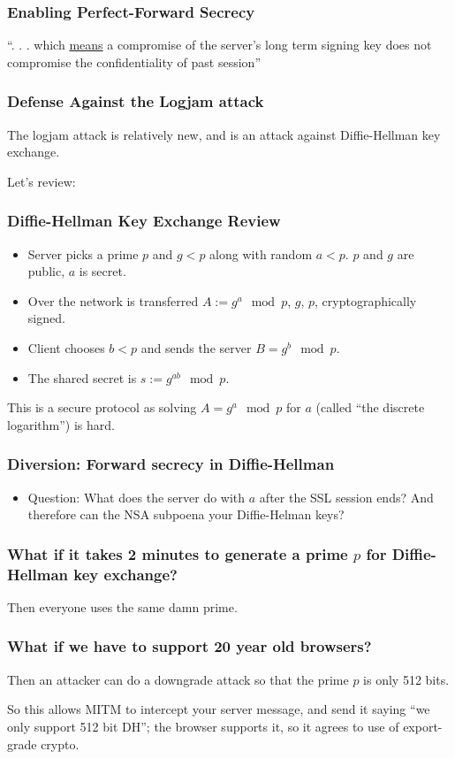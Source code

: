 \documentclass[9pt]{beamer}
\begin{document}
\begin{frame}[fragile]
\frametitle{Enabling Perfect-Forward Secrecy}
 ``. . . which \href{https://www.owasp.org/index.php/Transport_Layer_Protection_Cheat_Sheet}{means} a compromise of the server's long term signing key does not compromise the confidentiality of past session''

 
\end{frame}

\begin{frame}[fragile]
\frametitle{Defense Against the Logjam attack}
The logjam attack is relatively new, and is an attack against Diffie-Hellman key exchange. 

Let's review:
\end{frame}

\begin{frame}[fragile]
\frametitle{Diffie-Hellman Key Exchange Review}
\begin{itemize}
\item Server picks a prime $p$ and $g < p$ along with random $a< p$. $p$ and $g$ are public, $a$ is secret. 
\item Over the network is transferred $A := g^{a} \mod p$, $g$, $p$, cryptographically signed.
\item Client chooses $b < p$ and sends the server $B = g^{b}\mod p$.
\item The shared secret is $s := g^{ab} \mod p$.
\end{itemize}
This is a secure protocol as solving $A = g^{a} \mod p$ for $a$ (called ``the discrete logarithm'') is hard.
\end{frame}

\begin{frame}[fragile]
\frametitle{Diversion: Forward secrecy in Diffie-Hellman}
\begin{itemize}
\item Question: What does the server do with $a$ after the SSL session ends? And therefore can the NSA subpoena your Diffie-Helman keys?
\end{itemize}
\end{frame}

\begin{frame}[fragile]
\frametitle{What if it takes 2 minutes to generate a prime $p$ for Diffie-Hellman key exchange?}

Then everyone uses the same damn prime.
\end{frame}

\begin{frame}[fragile]
\frametitle{What if we have to support 20 year old browsers?}

Then an attacker can do a downgrade attack so that the prime $p$ is only 512 bits.

So this allows MITM to intercept your server message, and send it saying ``we only support 512 bit DH''; the browser supports it, so it agrees to use of export-grade crypto.
\end{frame}
\end{document}
